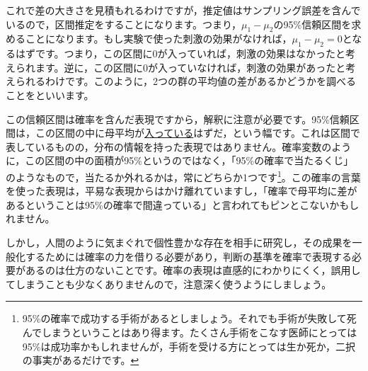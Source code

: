 \documentclass{ltjsbook}
\begin{document}
これで差の大きさを見積もれるわけですが，推定値はサンプリング誤差を含んでいるので，区間推定をすることになります。つまり，$\mu_1-\mu_2$の95\%信頼区間を求めることになります。もし実験で使った刺激の効果がなければ，$\mu_1-\mu_2=0$となるはずです。つまり，この区間に0が入っていれば，刺激の効果はなかったと考えられます。逆に，この区間に0が入っていなければ，刺激の効果があったと考えられるわけです。このように，2つの群の平均値の差があるかどうかを調べることをといいます。

この信頼区間は確率を含んだ表現ですから，解釈に注意が必要です。95\%信頼区間は，この区間の中に母平均が\underline{入っている}はずだ，という幅です。これは区間で表しているものの，分布の情報を持った表現ではありません。確率変数のように，この区間の中の面積が95\%というのではなく，「95\%の確率で当たるくじ」のようなもので，当たるか外れるかは，常にどちらか1つです\footnote{95\%の確率で成功する手術があるとしましょう。それでも手術が失敗して死んでしまうということはあり得ます。たくさん手術をこなす医師にとっては95\%は成功率かもしれませんが，手術を受ける方にとっては生か死か，二択の事実があるだけです。}。この確率の言葉を使った表現は，平易な表現からはかけ離れていますし，「確率で母平均に差があるということは95\%の確率で間違っている」と言われてもピンとこないかもしれません。

しかし，人間のように気まぐれで個性豊かな存在を相手に研究し，その成果を一般化するためには確率の力を借りる必要があり，判断の基準を確率で表現する必要があるのは仕方のないことです。確率の表現は直感的にわかりにくく，誤用してしまうことも少なくありませんので，注意深く使うようにしましょう。
\end{document}
